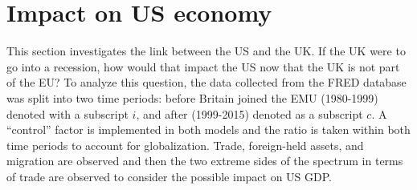 \documentclass[12pt]{article}
\begin{document}

\section{Impact on US economy}
This section investigates the link between the US and the UK. If the UK were to go into a recession, how would that impact the US now that the UK is not part of the EU? To analyze this question, the data collected from the FRED database was split into two time periods: before Britain joined the EMU (1980-1999) denoted with a subscript $i$, and after (1999-2015) denoted as a subscript $c$. A ``control'' factor is implemented in both models and the ratio is taken within both time periods to account for globalization. Trade, foreign-held assets, and migration are observed and then the two extreme sides of the spectrum in terms of trade are observed to consider the possible impact on US GDP.  
\end{document}
